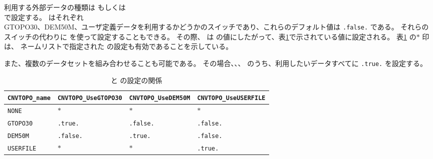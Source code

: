 利用する外部データの種類は  もしくは \\  で設定する。
 はそれぞれ \\ GTOPO30、DEM50M、ユーザ定義データを利用するかどうかのスイッチであり、これらのデフォルト値は \verb|.false.| である。
それらのスイッチの代わりに  を使って設定することもできる。
その際、 は の値にしたがって、表\ref{tab:cvntopo_name}で示されている値に設定される。
表\ref{tab:cvntopo_name} の$\ast$ 印は、
ネームリストで指定された の設定も有効であることを示している。

また、複数のデータセットを組み合わせることも可能である。
その場合、、、 のうち、利用したいデータすべてに \verb|.true.| を設定する。

\begin{table}[tbh]
\begin{center}
\caption{ と  の設定の関係}
\begin{tabularx}{150mm}{l|l|l|l} \hline
  \rowcolor[gray]{0.9} \verb|CNVTOPO_name|   & \verb|CNVTOPO_UseGTOPO30| & \verb|CNVTOPO_UseDEM50M| & \verb|CNVTOPO_UseUSERFILE| \\ \hline
                       \verb|NONE|           & $\ast$         & $\ast$         & $\ast$          \\ \hline
                       \verb|GTOPO30|        & \verb|.true.|  & \verb|.false.| & \verb|.false.|  \\ \hline
                       \verb|DEM50M|         & \verb|.false.| & \verb|.true.|  & \verb|.false.|  \\ \hline
                       \verb|USERFILE|       & $\ast$         & $\ast$         & \verb|.true.|   \\ \hline
\end{tabularx}
\label{tab:cvntopo_name}
\end{center}
\end{table}



